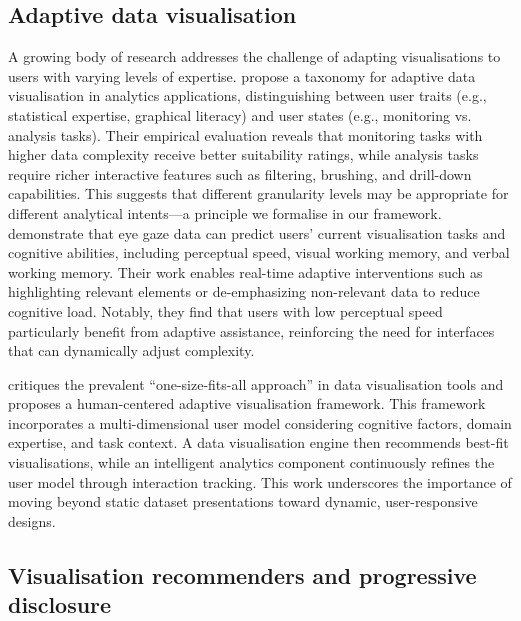 \documentclass[12pt,a4paper]{article}
\begin{document}
\subsection{Adaptive data visualisation}

A growing body of research addresses the challenge of adapting visualisations to users with varying levels of expertise. \citet{poetzsch2020towardataxonomy} propose a taxonomy for adaptive data visualisation in analytics applications, distinguishing between user traits (e.g., statistical expertise, graphical literacy) and user states (e.g., monitoring vs. analysis tasks). Their empirical evaluation reveals that monitoring tasks with higher data complexity receive better suitability ratings, while analysis tasks require richer interactive features such as filtering, brushing, and drill-down capabilities. This suggests that different granularity levels may be appropriate for different analytical intents---a principle we formalise in our framework.
\vspace{1em}
\noindent \citet{steichen2013useradaptiveinformationvisualisation} demonstrate that eye gaze data can predict users' current visualisation tasks and cognitive abilities, including perceptual speed, visual working memory, and verbal working memory. Their work enables real-time adaptive interventions such as highlighting relevant elements or de-emphasizing non-relevant data to reduce cognitive load. Notably, they find that users with low perceptual speed particularly benefit from adaptive assistance, reinforcing the need for interfaces that can dynamically adjust complexity.

\vspace{1em}

\noindent \citet{amyrotos2021adaptivevisualisationsfor} critiques the prevalent ``one-size-fits-all approach'' in data visualisation tools and proposes a human-centered adaptive visualisation framework. This framework incorporates a multi-dimensional user model considering cognitive factors, domain expertise, and task context. A data visualisation engine then recommends best-fit visualisations, while an intelligent analytics component continuously refines the user model through interaction tracking. This work underscores the importance of moving beyond static dataset presentations toward dynamic, user-responsive designs.

\subsection{Visualisation recommenders and progressive disclosure}
\end{document}
